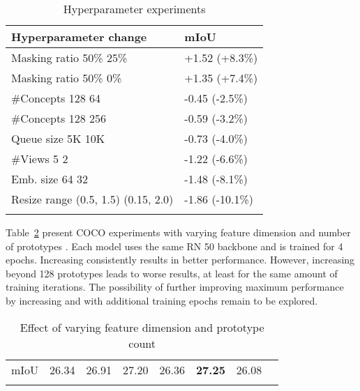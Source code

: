 \documentclass{bmvc2k}
\begin{document}
\setlength{\tabcolsep}{4pt}
\begin{table}
\begin{center}
\caption{Hyperparameter experiments}
\begin{tabular}{ll}
\hline\noalign{\smallskip}
Hyperparameter change &  mIoU\\ \hline
\noalign{\smallskip}
Masking ratio 50\%  25\%                   & +1.52 (+8.3\%)                   \\
Masking ratio 50\%  0\%                    & +1.35 (+7.4\%)                   \\
\#Concepts 128  64                           & -0.45 (-2.5\%)                   \\
\#Concepts 128  256                          & -0.59 (-3.2\%)                   \\
Queue size 5K  10K                             & -0.73 (-4.0\%)                   \\
\#Views 5  2                                 & -1.22 (-6.6\%)                   \\
Emb. size  64  32                                 & -1.48 (-8.1\%)                   \\
Resize range (0.5, 1.5)  (0.15, 2.0) & -1.86 (-10.1\%)  \\ \hline
\label{tab:hyperparam_exp}
\end{tabular}
\end{center}
\end{table}
\setlength{\tabcolsep}{1.4pt}

Table~\ref{tab:varying_feat_proto} present COCO experiments with varying feature dimension  and number of prototypes . Each model uses the same RN 50 backbone and is trained for 4 epochs. Increasing  consistently results in better performance. However, increasing  beyond 128 prototypes leads to worse results, at least for the same amount of training iterations. The possibility of further improving maximum performance by increasing  and  with additional training epochs remain to be explored.

\setlength{\tabcolsep}{4pt}
\begin{table}
\begin{center}
\caption{Effect of varying feature dimension  and prototype count }
\begin{tabular}{llllllll}
\hline\noalign{\smallskip}
 &  &  &  &  &  & \\ \hline
\noalign{\smallskip}
mIoU & 26.34 & 26.91 & 27.20 & 26.36 & \textbf{27.25} & 26.08 \\ \hline
\label{tab:varying_feat_proto}
\end{tabular}
\end{center}
\end{table}
\setlength{\tabcolsep}{1.4pt}
\end{document}
